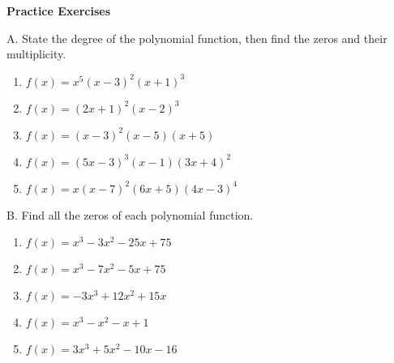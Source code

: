 \textbf{Practice Exercises}

\vspce

A. State the degree of the polynomial function, then find the zeros and their multiplicity. 
\begin{enumerate}[label = \arabic*. ]
\item \hspce $f(x)=x^5 (x-3)^2 (x+1)^3 $
\item \hspce $f(x)=(2x+1)^2 (x-2)^3$
\item \hspce $f(x)=(x-3)^2 (x-5) (x+5) $
\item \hspce $f(x)=(5x-3)^3 (x-1) (3x+4)^2 $
\item \hspce $f(x)=x(x-7)^2 (6x+5) (4x-3)^4 $
\end{enumerate} 

B. Find all the zeros of each polynomial function. 
\begin{enumerate}[label = \arabic*. ]
\item \hspce $f(x) =x^3-3x^2-25x+75$
\item \hspce $f(x) =x^3-7x^2-5x+75$
\item \hspce $f(x) =-3x^3+12x^2+15x$
\item \hspce $f(x) =x^3-x^2-x+1$
\item \hspce $f(x) =3x^3+5x^2-10x-16$
\end{enumerate} 